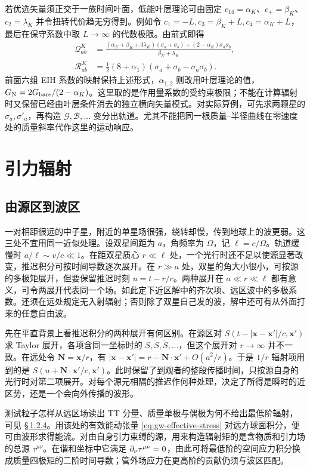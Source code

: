 若优选矢量须正交于一族时间叶面，低能叶层理论可由固定 $c_{14}=\alpha_K$、$c_+=\beta_K$、$c_2=\lambda_K$ 并令扭转代价趋无穷得到。例如令 $c_1=-L,c_3=\beta_K+L,c_4=\alpha_K+L$，最后在保守系数中取 $L\to\infty$ 的代数极限。由前式即得
\begin{align*}
 \mathcal Q_{ab}^{K}&=
 \frac{(\alpha_K+\beta_K+3\lambda_K)(\sigma_a+\sigma_b)
                    +(2-\alpha_K)\sigma_a\sigma_b}{\beta_K+\lambda_K},\\
 \mathcal R_{ab}^{K}&=\tfrac12(8+\alpha_1)(\sigma_a+\sigma_b-\sigma_a\sigma_b).
\end{align*}
前面六组 EIH 系数的映射保持上述形式，$\alpha_{1,2}$ 则改用叶层理论的值，$G_{\rm N}=2G_{\rm bare}/(2-\alpha_K)$。这里取的是作用量系数的受约束极限；不能在计算辐射时又保留已经由叶层条件消去的独立横向矢量模式。对实际算例，可先求两颗星的 $\sigma_a,\sigma'_a$，再构造 $\mathcal G,\mathcal B,\ldots$ 变分出轨道。尤其不能把同一根质量--半径曲线在零速度处的质量斜率代作这里的运动响应。

\section{引力辐射}

\subsection{由源区到波区}\label{sec:pn-matching}

一对相距很远的中子星，附近的单星场很强，绕转却慢，传到地球上的波更弱。这三处不宜用同一近似处理。设双星间距为 $a$，角频率为 $\Omega$，记 $\ell=c/\Omega$。轨道缓慢时 $a/\ell\sim v/c\ll1$。在距双星质心 $r\ll\ell$ 处，一个光行时还不足以使源显著改变，推迟积分可按时间导数逐次展开。在 $r\gg a$ 处，双星的角大小很小，可按源的多极矩展开，但要保留推迟时刻 $u=t-r/c$。两种展开在 $a\ll r\ll\ell$ 都有意义，可令两展开代表同一个场。如此定下近区解中的齐次项、远区波中的多极系数。还须在远处规定无入射辐射；否则除了双星自己发的波，解中还可有从外面打来的任意自由波。

先在平直背景上看推迟积分的两种展开有何区别。在源区对 $S(t-|\bm x-\bm x'|/c,\bm x')$ 求 Taylor 展开，各项含同一坐标时的 $S,\dot S,\ddot S,\ldots$，但这个展开对 $r\to\infty$ 并不一致。在远处令 $\bm N=\bm x/r$，有 $|\bm x-\bm x'|=r-\bm N\cdot\bm x'+O(a^2/r)$。于是 $1/r$ 辐射项用到的是 $S(u+\bm N\cdot\bm x'/c,\bm x')$。此时保留了到观者的整段传播时间，只按源自身的光行时对第二项展开。对每个源元相隔的推迟作何种处理，决定了所得是瞬时的近区势，还是一个会向外传播的波形。

测试粒子怎样从远区场读出 TT 分量、质量单极与偶极为何不给出最低阶辐射，可见 \hyperlink{subsection.1.2.4}{\S\,1.2.4}。用该处的有效能动张量 \eqref{eq:gw-effective-stress} 对远方球面积分，便可由波形求得能流。对由自身引力束缚的源，用来构造辐射矩的是含物质和引力场的总源 $\tau^{\mu\nu}$。在谐和坐标中它满足 $\partial_\nu\tau^{\mu\nu}=0$，由此可将最低阶的空间应力积分换成质量四极矩的二阶时间导数；管外场应力在更高阶的贡献仍须与波区匹配。

